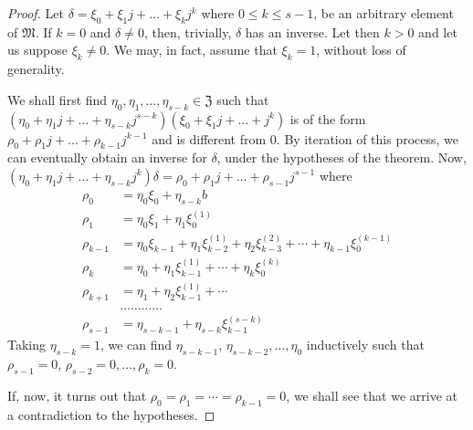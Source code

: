 \begin{proof}
Let $\delta = \xi_0 + \xi_1 j +\ldots + \xi_k j^k$ where $0\leq k \leq
s-1$, be an arbitrary element of $\mathfrak{M}$. If $k=0$ and $\delta
\neq 0$, then, trivially, $\delta$ has an inverse. Let then $k>0$ and
let us suppose $\xi_k \neq 0$. We may, in fact, assume that $\xi_k =
1$, without loss of generality.

We shall first find $\eta_0, \eta_1,\ldots, \eta_{s-k} \in
\mathfrak{Z}$ such that $(\eta_0 + \eta_1 j + \ldots + \eta_{s-k}
j^{s-k}) (\xi_0 + \xi_1 j + \ldots + j^k)$ is of the form $\rho_0 +
\rho_1 j + \ldots + \rho_{k-1} j^{k-1}$ and is different from $0$. By
iteration of this process, we can eventually obtain an inverse for
$\delta$, under the hypotheses of the theorem. Now, $(\eta_0+\eta_1 j
+ \ldots + \eta_{s-k} j^k)\delta = \rho_0+\rho_1 j+\ldots + \rho_{s-1}
j^{s-1}$ where
\begin{align*}
\rho_0 & = \eta_0 \xi_0 + \eta_{s-k} b\\
\rho_1 & = \eta_0 \xi_1 + \eta_1 \xi^{(1)}_0\\
\rho_{k-1} & = \eta_0 \xi_{k-1} + \eta_1 \xi^{(1)}_{k-2} + \eta_2
\xi^{(2)}_{k-3} + \cdots + \eta_{k-1} \xi^{(k-1)}_0\\
\rho_k & = \eta_0 + \eta_1 \xi^{(1)}_{k-1} + \cdots + \eta_k
\xi^{(k)}_0\\
\rho_{k+1} & = \eta_1 + \eta_2 \xi^{(1)}_{k-1} + \cdots\\
&\ldots \ldots \ldots \ldots \\
\rho_{s-1} & = \eta_{s-k-1} + \eta_{s-k} \xi^{(s-k)}_{k-1}
\end{align*}
Taking $\eta_{s-k}=1$, we can find $\eta_{s-k-1}$,
$\eta_{s-k-2},\ldots, \eta_0$ inductively such that $\rho_{s-1}=0$,
$\rho_{s-2} = 0,\ldots, \rho_k =0$.

If, now, it turns out that $\rho_0 = \rho_1 = \cdots = \rho_{k-1} =0$,
we shall see that we arrive at a contradiction to the hypotheses.


\end{proof}
